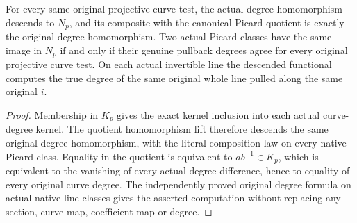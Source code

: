 \begin{theorem}
\label{thm:seven-native-curve-degree-descent}
\leanok
{}
For every same original projective curve test, the actual degree
homomorphism descends to $N_p$, and its composite with the canonical
Picard quotient is exactly the original degree homomorphism. Two actual
Picard classes have the same image in $N_p$ if and only if their genuine
pullback degrees agree for every original projective curve test. On each
actual invertible line the descended functional computes the true degree
of the same original whole line pulled along the same original $i$.
\end{theorem}
\begin{proof}
Membership in $K_p$ gives the exact kernel inclusion into each actual
curve-degree kernel. The quotient homomorphism lift therefore descends
the same original degree homomorphism, with the literal composition law
on every native Picard class. Equality in the quotient is equivalent to
$a b^{-1}\in K_p$, which is equivalent to the vanishing of every actual
degree difference, hence to equality of every original curve degree.
The independently proved original degree formula on actual native line
classes gives the asserted computation without replacing any section,
curve map, coefficient map or degree.
\end{proof}



